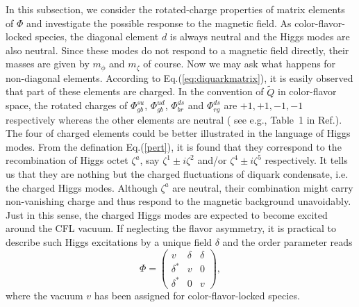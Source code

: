 \documentclass[12pt]{article}
\begin{document}
In this subsection, we consider the rotated-charge properties of matrix elements of $\Phi$ and investigate the
possible response to the magnetic field.
As color-flavor-locked species, the diagonal element $d$ is always neutral and the Higgs modes are also neutral.
Since these modes do not respond to a magnetic field directly, their masses are given by $m_\phi$ and $m_\zeta$
of course.
Now we may ask what happens for non-diagonal elements. According to Eq.(\ref{eq:diquarkmatrix}), it is easily
observed that part of these elements are charged.
In the convention of $\widetilde{Q}$ in color-flavor space, the rotated charges of $\Phi_{gb}^{su}$,
$\Phi_{gb}^{ud}$, $\Phi_{br}^{ds}$ and $\Phi_{rg}^{ds}$ are $+1,+1,-1,-1$ respectively whereas the other elements
are neutral ( see e.g., Table~1 in Ref.\cite{zhang2015magnetic}).
The four of charged elements could be better illustrated in the
language of Higgs modes. From the defination Eq.(\ref{pert}), it is found that they correspond to the recombination
of Higgs octet $\zeta^a$, say $\zeta^1 \pm i\zeta^2$ and/or $\zeta^4 \pm i\zeta^5$ respectively.
It tells us that they are nothing but the charged fluctuations of diquark condensate, i.e. the charged Higgs modes.
Although $\zeta^a$ are neutral, their combination might carry non-vanishing charge and thus respond to the magnetic background unavoidably.
Just in this sense, the charged Higgs modes are expected to become excited around the CFL vacuum.
If neglecting the flavor asymmetry, it is practical to describe such Higgs excitations by a
unique field $\delta$ and the order parameter reads
\begin{equation}
  \label{eq:diquarkmatrix0}
\Phi = \begin{pmatrix} v & \delta & \delta \\ \delta^* &  v & 0 \\ \delta^* & 0 & v\end{pmatrix},
\end{equation}
where the vacuum $v$ has been assigned for color-flavor-locked species.
\end{document}
